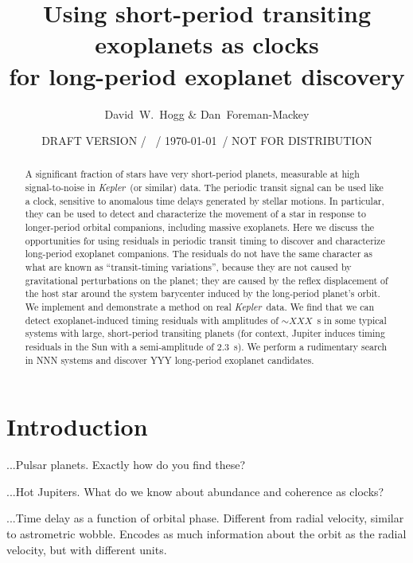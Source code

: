 \documentclass[12pt, preprint]{aastex}
\newcounter{affil}
\newcommand{\project}[1]{\textsl{#1}}
\newcommand{\Kepler}{\project{Kepler}}
\begin{document}
\title{
  Using short-period transiting exoplanets as clocks \\
  for long-period exoplanet discovery
}
\author{
  David~W.~Hogg\altaffilmark{\ref{ccpp},\ref{cds},\ref{mpia},\ref{email}}
  \&
  Dan~Foreman-Mackey\altaffilmark{\ref{ccpp}}
}
\date{DRAFT VERSION / \texttt{\githash}\ / \today\ / NOT FOR DISTRIBUTION}
\label{ccpp}
\label{cds}
\label{mpia}
\label{email}

\begin{abstract}
A significant fraction of stars have very short-period planets,
measurable at high signal-to-noise in \Kepler\ (or similar) data.
The periodic transit signal can be used like a clock, sensitive to
anomalous time delays generated by stellar motions.
In particular, they can be used to detect and characterize the
movement of a star in response to longer-period orbital companions,
including massive exoplanets.
Here we discuss the opportunities for using residuals in periodic
transit timing to discover and characterize long-period exoplanet
companions.
The residuals do not have the same character as what are known as
``transit-timing variations'', because they are not caused by
gravitational perturbations on the planet; they are caused by the
reflex displacement of the host star around the system barycenter
induced by the long-period planet's orbit.
We implement and demonstrate a method on real \Kepler\ data.  We find
that we can detect exoplanet-induced timing residuals with amplitudes
of $\sim XXX$~s in some typical systems with large, short-period
transiting planets (for context, Jupiter induces timing residuals in
the Sun with a semi-amplitude of 2.3~s).
We perform a rudimentary search in NNN systems and discover YYY
long-period exoplanet candidates.
\end{abstract}

\section{Introduction}

...Pulsar planets.  Exactly how do you find these?

...Hot Jupiters.  What do we know about abundance and coherence as
clocks?

...Time delay as a function of orbital phase.  Different from radial
velocity, similar to astrometric wobble.  Encodes as much information
about the orbit as the radial velocity, but with different units.
\end{document}
